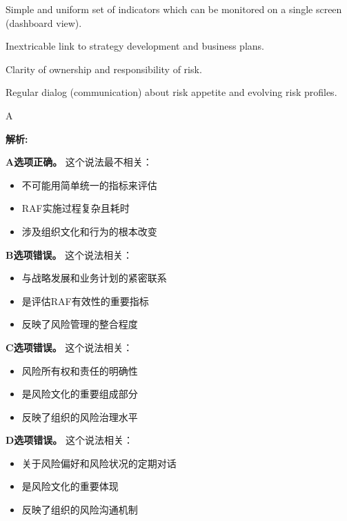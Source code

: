 \documentclass{article}
\newenvironment{explanation}
{\textbf{解析:}\par}
{\par}
\begin{document}
\begin{choices}
    \item Simple and uniform set of indicators which can be monitored on a single screen (dashboard view).
    \item Inextricable link to strategy development and business plans.
    \item Clarity of ownership and responsibility of risk.
    \item Regular dialog (communication) about risk appetite and evolving risk profiles.
\end{choices}

\begin{correctanswer}
    A
\end{correctanswer}

\begin{explanation}
    \textbf{A选项正确。}
    这个说法最不相关：
    \begin{itemize}
        \item 不可能用简单统一的指标来评估
        \item RAF实施过程复杂且耗时
        \item 涉及组织文化和行为的根本改变
    \end{itemize}

    \textbf{B选项错误。}
    这个说法相关：
    \begin{itemize}
        \item 与战略发展和业务计划的紧密联系
        \item 是评估RAF有效性的重要指标
        \item 反映了风险管理的整合程度
    \end{itemize}

    \textbf{C选项错误。}
    这个说法相关：
    \begin{itemize}
        \item 风险所有权和责任的明确性
        \item 是风险文化的重要组成部分
        \item 反映了组织的风险治理水平
    \end{itemize}

    \textbf{D选项错误。}
    这个说法相关：
    \begin{itemize}
        \item 关于风险偏好和风险状况的定期对话
        \item 是风险文化的重要体现
        \item 反映了组织的风险沟通机制
    \end{itemize}
\end{explanation}
\end{document}
